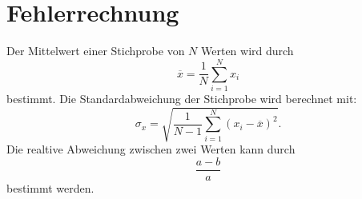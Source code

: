 \section{Fehlerrechnung}

Der Mittelwert einer Stichprobe von $N$ Werten wird durch
\begin{equation}
    \overline{x} = \frac{1}{N} \sum_{i=1}^N x_i
    \label{eqn:mittelwert}
\end{equation}
bestimmt.
\newline
Die Standardabweichung der Stichprobe wird berechnet mit:
\begin{equation*}
    \sigma_x = \sqrt{\frac{1}{N-1} \sum_{i=1}^N (x_i - \overline{x})^2}.
    \label{eqn:standard}
\end{equation*}
\newline
Die realtive Abweichung zwischen zwei Werten kann durch
\begin{equation*}
    \frac{a-b}{a}
\end{equation*}
bestimmt werden.